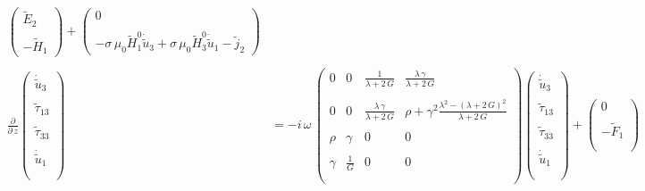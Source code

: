 \begin{align}
\begin{pmatrix}
\tilde{E}_2\\\\
-\tilde{H}_1
\end{pmatrix}
+
\begin{pmatrix}
0\\\\
-\sigma\,\mu_0\tilde{H}_1^0\dot{\tilde{u}}_3+\sigma\,\mu_0\tilde{H}_3^0\dot{\tilde{u}}_1 
-\tilde{j}_2
\end{pmatrix}\\\nonumber\\\label{eq.matricial_3}
\frac{\partial}{\partial\,z}
\begin{pmatrix}
\dot{\tilde{u}}_3\\\\
\tilde{\tau}_{13}\\\\
\tilde{\tau}_{33}\\\\
\dot{\tilde{u}}_1\\\\
\end{pmatrix}
&=-i\,\omega\,
\begin{pmatrix}
0&0&\frac{1}{\lambda+2\,G}&\frac{\lambda\,\gamma}{\lambda+2\,G}\\\\
0&0&\frac{\lambda\,\gamma}{\lambda+2\,G}&\rho+\gamma^2\frac{\lambda^2-(\lambda+2\,G)^2}{\lambda+2\,G}\\\\
\rho&\gamma&0&0\\\\
\gamma&\frac{1}{G}&0&0\\\\
\end{pmatrix}
\begin{pmatrix}
\dot{\tilde{u}}_3\\\\
\tilde{\tau}_{13}\\\\
\tilde{\tau}_{33}\\\\
\dot{\tilde{u}}_1\\\\
\end{pmatrix}
+
\begin{pmatrix}
0\\\\
-\tilde{F}_1\\\\

\end{pmatrix}
\end{align}
